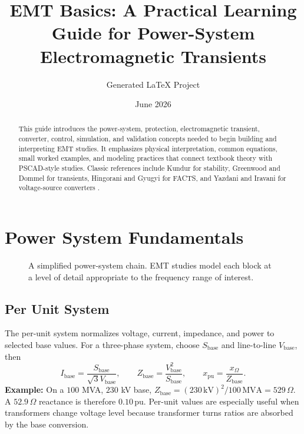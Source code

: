 \documentclass[11pt]{article}
\title{EMT Basics: A Practical Learning Guide for Power-System Electromagnetic Transients}
\author{Generated LaTeX Project}
\date{June 2026}
\newcommand{\pu}{\mathrm{pu}}
\begin{document}
\maketitle

\begin{abstract}
This guide introduces the power-system, protection, electromagnetic transient, converter, control, simulation, and validation concepts needed to begin building and interpreting EMT studies. It emphasizes physical interpretation, common equations, small worked examples, and modeling practices that connect textbook theory with PSCAD-style studies. Classic references include Kundur for stability, Greenwood and Dommel for transients, Hingorani and Gyugyi for FACTS, and Yazdani and Iravani for voltage-source converters \cite{kundur1994,greenwood1991,dommel1969,hingorani2000,yazdani2010}.
\end{abstract}

\tableofcontents
\newpage

\section{Power System Fundamentals}
\begin{figure}[h]
\centering

\caption{A simplified power-system chain. EMT studies model each block at a level of detail appropriate to the frequency range of interest.}
\end{figure}

\subsection{Per Unit System}
The per-unit system normalizes voltage, current, impedance, and power to selected base values. For a three-phase system, choose $S_{\mathrm{base}}$ and line-to-line $V_{\mathrm{base}}$, then
\begin{equation}
I_{\mathrm{base}}=\frac{S_{\mathrm{base}}}{\sqrt{3}V_{\mathrm{base}}},\qquad
Z_{\mathrm{base}}=\frac{V_{\mathrm{base}}^2}{S_{\mathrm{base}}},\qquad
x_{\pu}=\frac{x_{\Omega}}{Z_{\mathrm{base}}}.
\end{equation}
\textbf{Example:} On a $100$ MVA, $230$ kV base, $Z_{\mathrm{base}}=(230\,\mathrm{kV})^2/100\,\mathrm{MVA}=529\,\Omega$. A $52.9\,\Omega$ reactance is therefore $0.10\,\pu$. Per-unit values are especially useful when transformers change voltage level because transformer turns ratios are absorbed by the base conversion.
\end{document}
